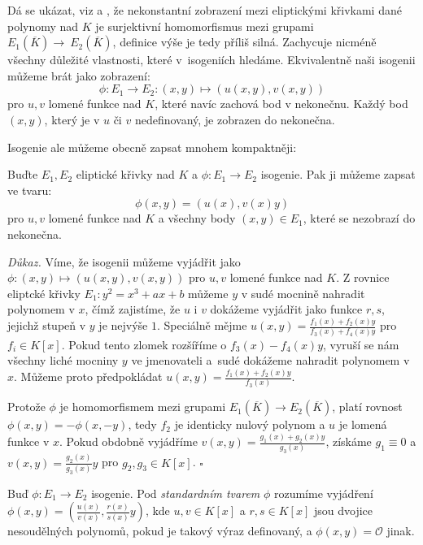 \documentclass[12pt]{report}
\begin{document}
Dá se ukázat, viz \cite[II.6.8.]{Hartshorne} a \cite[III.4.8.]{Silverman}, že nekonstantní zobrazení mezi eliptickými křivkami dané polynomy nad $K$ je surjektivní homomorfismus mezi grupami $E_1 (\overline{K}) \longrightarrow~E_2(\overline{K})$, definice výše je tedy příliš silná. Zachycuje nicméně všechny důležité vlastnosti, které v~isogeniích hledáme. Ekvivalentně naši isogenii můžeme brát jako zobrazení:
\begin{equation*}
\phi: E_1 \longrightarrow E_2 :  (x,y) \longmapsto (u(x,y),v(x,y))
\end{equation*}
pro $u,v$ lomené funkce nad $K$, které navíc zachová bod v nekonečnu. Každý bod $(x,y)$, který je v $u$ či $v$ nedefinovaný, je zobrazen do nekonečna.

Isogenie ale můžeme obecně zapsat mnohem kompaktněji:
\begin{veta}
Buďte $E_1,E_2$ eliptické křivky nad $K$ a $\phi : E_1 \longrightarrow E_2 $ isogenie. Pak ji můžeme zapsat ve tvaru:
\begin{equation*}
\phi(x,y) = \left(u(x), v(x) y \right)
\end{equation*}
pro $u,v$ lomené funkce nad $K$ a všechny body $(x,y) \in E_1$, které se nezobrazí do nekonečna.  
\end{veta}

\noindent \textit{Důkaz.} Víme, že isogenii můžeme vyjádřit jako $\phi: (x,y) \mapsto (u(x,y),v(x,y))$ pro $u,v$ lomené funkce nad $K$. Z rovnice eliptcké křivky $E_1 : y^2 = x^3 + ax +b$ můžeme $y$ v sudé mocnině nahradit polynomem v $x$, čímž zajistíme, že $u$ i $v$ dokážeme vyjádřit jako funkce $r,s$, jejichž stupeň v $y$ je nejvýše $1$. Speciálně mějme $u(x,y) = \frac{f_1(x)+f_2(x)y}{f_3(x)+f_4(x) y}$ pro $f_i \in K[x]$. Pokud  tento zlomek rozšíříme o $f_3(x)-f_4(x)y$, vyruší se nám všechny liché mocniny $y$ ve jmenovateli a~sudé dokážeme nahradit polynomem v $x$. Můžeme proto předpokládat $u(x,y) = \frac{f_1(x)+f_2(x)y}{f_3(x)}$.

Protože $\phi$ je homomorfismem mezi grupami $E_1(\overline{K}) \longrightarrow E_2(\overline{K})$, platí rovnost $\phi(x,y) = -\phi(x,-y)$, tedy $f_2$ je identicky nulový polynom a $u$ je lomená funkce v $x$. Pokud obdobně vyjádříme $v(x,y) = \frac{g_1(x)+g_2(x)y}{g_3(x)}$, získáme $g_1 \equiv 0$ a $v(x,y) = \frac{g_2(x)}{g_3(x)}y$ pro $g_2,g_3 \in K[x]$. \hfill $\square$\\

\begin{definice}
Buď $\phi : E_1 \longrightarrow E_2$ isogenie. Pod \textit{standardním tvarem} $\phi$ rozumíme vyjádření $ \phi(x,y) = \left(\frac{u(x)}{v(x)}, \frac{r(x)}{s(x)} y \right)$, kde $u,v \in K[x]$ a $r,s \in K[x]$ jsou dvojice nesoudělných polynomů, pokud je takový výraz definovaný, a $\phi(x,y) = \mathcal{O}$ jinak.
\end{definice}
\end{document}
